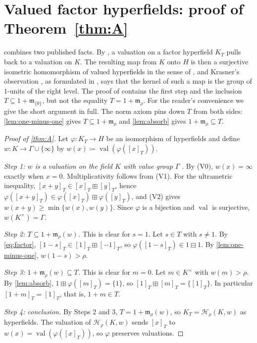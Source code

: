 \documentclass[11pt]{amsart}
\numberwithin{equation}{section}
\newcommand{\hplus}{\boxplus}
\newcommand{\hminus}{\boxminus}
\newcommand{\val}{\operatorname{val}}
\newcommand{\m}{\mathfrak m}
\newcommand{\Hr}{\mathcal H_\rho}
\newcommand{\cls}[1]{[#1]}
\begin{document}
\section{Valued factor hyperfields: proof of Theorem~\ref{thm:A}}\label{sec:A}

 combines two published facts. By \cite[Lemma~3.6]{Linzi25}, a valuation on a factor hyperfield $K_T$ pulls back to a valuation on $K$. The resulting map from $K$ onto $H$ is then a surjective isometric homomorphism of valued hyperfields in the sense of \cite[Definition~1.18]{LT25}, and Krasner's observation \cite[p.~148]{Krasner57}, as formulated in \cite[Lemma~1.25]{LT25}, says that the kernel of such a map is the group of $1$-units of the right level. The proof of \cite[Proposition~4.11]{Linzi25} contains the first step and the inclusion $T\subseteq 1+\m_{\{0\}}$, but not the equality $T=1+\m_\rho$. For the reader's convenience we give the short argument in full. The norm axiom pins down $T$ from both sides: \cref{lem:one-minus-one} gives $T\subseteq 1+\m_\rho$ and \cref{lem:absorb} gives $1+\m_\rho\subseteq T$.

\begin{proof}[Proof of \cref{thm:A}]
Let $\varphi\colon K_T\to H$ be an isomorphism of hyperfields and define $w\colon K\to\Gamma\cup\{\infty\}$ by $w(x)\coloneqq\val(\varphi(\cls x_T))$.

\emph{Step 1: $w$ is a valuation on the field $K$ with value group $\Gamma$} \cite[Lemma~3.6]{Linzi25}. By (V0), $w(x)=\infty$ exactly when $x=0$. Multiplicativity follows from (V1). For the ultrametric inequality, $\cls{x+y}_T\in\cls x_T\hplus\cls y_T$, hence $\varphi(\cls{x+y}_T)\in\varphi(\cls x_T)\hplus\varphi(\cls y_T)$, and (V2) gives $w(x+y)\ge\min\{w(x),w(y)\}$. Since $\varphi$ is a bijection and $\val$ is surjective, $w(K^\times)=\Gamma$.

\emph{Step 2: $T\subseteq 1+\m_\rho(w)$.} This is clear for $s=1$. Let $s\in T$ with $s\ne1$. By \eqref{eq:factor}, $\cls{1-s}_T\in\cls1_T\hplus\cls{-1}_T$, so $\varphi(\cls{1-s}_T)\in 1\hminus1$. By \cref{lem:one-minus-one}, $w(1-s)>\rho$.

\emph{Step 3: $1+\m_\rho(w)\subseteq T$.} This is clear for $m=0$. Let $m\in K^\times$ with $w(m)>\rho$. By \cref{lem:absorb}, $1\hplus\varphi(\cls m_T)=\{1\}$, so $\cls1_T\hplus\cls m_T=\{\cls1_T\}$. In particular $\cls{1+m}_T=\cls1_T$, that is, $1+m\in T$.

\emph{Step 4: conclusion.} By Steps 2 and 3, $T=1+\m_\rho(w)$, so $K_T=\Hr(K,w)$ as hyperfields. The valuation of $\Hr(K,w)$ sends $\cls x_T$ to $w(x)=\val(\varphi(\cls x_T))$, so $\varphi$ preserves valuations.
\end{proof}
\end{document}
